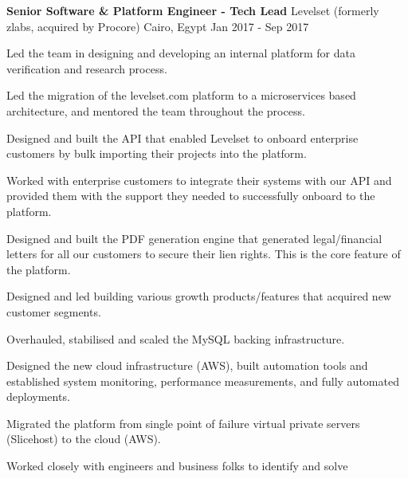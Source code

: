 \begin{cventries}
	\cventry
	{\textbf{Senior Software \& Platform Engineer - Tech Lead}} %
	{Levelset (formerly zlabs, acquired by Procore)} %
	{Cairo, Egypt} %
	{Jan 2017 - Sep 2017} %
	{
		\begin{cvitems} %
			\item {
			            Led the team in designing and developing an internal platform for data
			            verification and research process.
			      }
			\item {
			            Led the migration of the levelset.com platform to a microservices based
			            architecture, and mentored the team throughout the process.
			      }
			\item {
			            Designed and built the API that enabled Levelset to onboard enterprise
			            customers by bulk importing their projects into the platform.
			      }
			\item {
			            Worked with enterprise customers to integrate their systems with our
			            API and provided them with the support they needed to successfully
			            onboard to the platform.
			      }
			\item {
			            Designed and built the PDF generation engine that generated
			            legal/financial letters for all our customers to secure their lien
			            rights. This is the core feature of the platform.
			      }
			\item {
			            Designed and led building various growth products/features that acquired
			            new customer segments.
			      }
		\end{cvitems}
		\begin{cvitems}
			\item {
			            Overhauled, stabilised and scaled the MySQL backing infrastructure.
			      }
			\item {
			            Designed the new cloud infrastructure (AWS), built automation tools and
			            established system monitoring, performance measurements, and fully
			            automated deployments.
			      }
			\item {
			            Migrated the platform from single point of failure virtual private
			            servers (Slicehost) to the cloud (AWS).
			      }
			\item {
			            Worked closely with engineers and business folks to identify and solve
}
\end{cvitems}}
\end{cventries}
